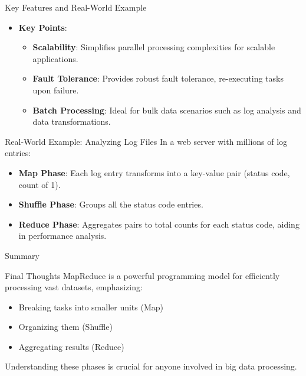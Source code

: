 \documentclass[aspectratio=169]{beamer}
\begin{document}
\begin{frame}{Key Features and Real-World Example}
    \begin{itemize}
        \item \textbf{Key Points}:
        \begin{itemize}
            \item \textbf{Scalability}: Simplifies parallel processing complexities for scalable applications.
            \item \textbf{Fault Tolerance}: Provides robust fault tolerance, re-executing tasks upon failure.
            \item \textbf{Batch Processing}: Ideal for bulk data scenarios such as log analysis and data transformations.
        \end{itemize}
    \end{itemize}

    \begin{block}{Real-World Example: Analyzing Log Files}
        In a web server with millions of log entries:
        \begin{itemize}
            \item \textbf{Map Phase}: Each log entry transforms into a key-value pair (status code, count of 1).
            \item \textbf{Shuffle Phase}: Groups all the status code entries.
            \item \textbf{Reduce Phase}: Aggregates pairs to total counts for each status code, aiding in performance analysis.
        \end{itemize}
    \end{block}
\end{frame}

\begin{frame}{Summary}
    \begin{block}{Final Thoughts}
        MapReduce is a powerful programming model for efficiently processing vast datasets, emphasizing:
        \begin{itemize}
            \item Breaking tasks into smaller units (Map)
            \item Organizing them (Shuffle)
            \item Aggregating results (Reduce)
        \end{itemize}
        Understanding these phases is crucial for anyone involved in big data processing.
    \end{block}
\end{frame}
\end{document}
